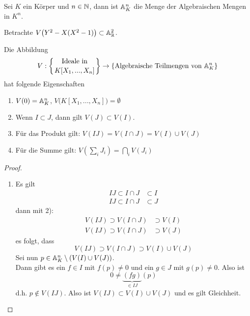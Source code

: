	
	\begin{definition}
		Sei $K$ ein Körper und $n\in\mathbb{N}$, dann ist $\mathbb{A}_K^n$ die Menge der Algebraischen Mengen in $K^n$.
	\end{definition}
	
	\begin{exm}
		Betrachte $V\big(Y^2-X(X^2-1)\big)\subset \mathbb{A}^2_{\mathbb{R}}$.
	\end{exm}

	\begin{satz}
		Die Abbildung
		\[V:\left\{\text{Ideale in}\atop{K[X_1,...,X_n]}\right\}\to\left\{\text{Algebraische Teilmengen von $\mathbb{A}^n_K$}\right\}\]
		hat folgende Eigenschaften
		\begin{enumerate}
			\item $V(0)=\mathbb{A}_K^n$, $V\big(K[X_1,...,X_n]\big)=\emptyset$
			\item Wenn $I\subset J$, dann gilt $V(J)\subset V(I)$.
			\item Für das Produkt gilt: $V(IJ)=V(I\cap J)=V(I)\cup V(J)$
			\item Für die Summe gilt: $V(\sum_i J_i)=\bigcap_i V(J_i)$
		\end{enumerate}
	\end{satz}
	\begin{proof}
		\begin{enumerate}
			Wir zeigen nur
			\addtocounter{enumi}{2}
			\item Es gilt
			\begin{align*}
			IJ\subset I\cap J&\subset I\\
			IJ\subset I\cap J&\subset J
			\end{align*}
			dann mit 2):
			\begin{align*}
			V(IJ)\supset V(I\cap J)&\supset V(I)\\
			V(IJ)\supset V(I\cap J)&\supset V(J)
			\end{align*}
			es folgt, dass
			\[V(IJ)\supset V(I\cap J)\supset V(I)\cup V(J)\]
			Sei nun $p\in \mathbb{A}_K^n\setminus(V(I)\cup V(J))$.\\
			Dann gibt es ein $f\in I$ mit $f(p)\neq 0$ und ein $g\in J$ mit $g(p)\neq 0$. Also ist 
			\[0\neq\underbrace{(fg)}_{\in IJ}(p)\]
			d.h. $p\notin V(IJ)$. Also ist $V(IJ)\subset V(I)\cup V(J)$ und es gilt Gleichheit.
		\end{enumerate}
	\end{proof}

